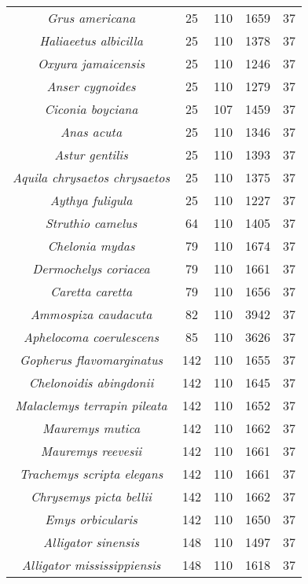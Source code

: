\begin{longtable}[c]{|c|c|c|c|c|}
\textit{Grus americana}               & 25   & 110 & 1659 & 37 \\
\textit{Haliaeetus albicilla}         & 25   & 110 & 1378 & 37 \\
\textit{Oxyura jamaicensis}           & 25   & 110 & 1246 & 37 \\
\textit{Anser cygnoides}              & 25   & 110 & 1279 & 37 \\
\textit{Ciconia boyciana}             & 25   & 107 & 1459 & 37 \\
\textit{Anas acuta}                   & 25   & 110 & 1346 & 37 \\
\textit{Astur gentilis}               & 25   & 110 & 1393 & 37 \\
\textit{Aquila chrysaetos chrysaetos} & 25   & 110 & 1375 & 37 \\
\textit{Aythya fuligula}              & 25   & 110 & 1227 & 37 \\
\textit{Struthio camelus}             & 64   & 110 & 1405 & 37 \\
\textit{Chelonia mydas}               & 79   & 110 & 1674 & 37 \\
\textit{Dermochelys coriacea}         & 79   & 110 & 1661 & 37 \\
\textit{Caretta caretta}              & 79   & 110 & 1656 & 37 \\
\textit{Ammospiza caudacuta}          & 82   & 110 & 3942 & 37 \\
\textit{Aphelocoma coerulescens}      & 85   & 110 & 3626 & 37 \\
\textit{Gopherus flavomarginatus}     & 142  & 110 & 1655 & 37 \\
\textit{Chelonoidis abingdonii}       & 142  & 110 & 1645 & 37 \\
\textit{Malaclemys terrapin pileata}  & 142  & 110 & 1652 & 37 \\
\textit{Mauremys mutica}              & 142  & 110 & 1662 & 37 \\
\textit{Mauremys reevesii}            & 142  & 110 & 1661 & 37 \\
\textit{Trachemys scripta elegans}    & 142  & 110 & 1661 & 37 \\
\textit{Chrysemys picta bellii}       & 142  & 110 & 1662 & 37 \\
\textit{Emys orbicularis}             & 142  & 110 & 1650 & 37 \\
\textit{Alligator sinensis}           & 148  & 110 & 1497 & 37 \\
\textit{Alligator mississippiensis}   & 148  & 110 & 1618 & 37 \\

\end{longtable}
